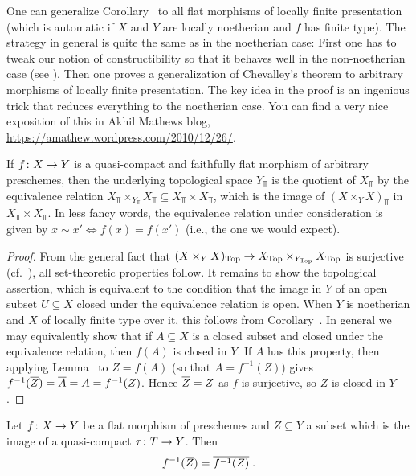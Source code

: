 \documentclass[a4paper,parskip=half,numbers=enddot, DIV=12]{scrreprt}
\begin{document}
\begin{rem}
	One can generalize Corollary~ to all flat morphisms of locally finite presentation (which is automatic if $X$ and $Y$ are locally noetherian and $f$ has finite type). The strategy in general is quite the same as in the noetherian case: First one has to tweak our notion of constructibility so that it behaves well in the non-noetherian case (see \cite[ and  ]{stacks-project}). Then one proves a generalization of Chevalley's theorem to arbitrary morphisms of locally finite presentation. The key idea in the proof is an ingenious trick that reduces everything to the noetherian case. You can find a very nice exposition of this in Akhil Mathews blog, \url{https://amathew.wordpress.com/2010/12/26/}.
\end{rem}
\begin{prop}
	If $f\colon X\morphism Y$ is a quasi-compact and faithfully flat morphism of arbitrary preschemes, then the underlying topological space $Y_\Top$ is the quotient of $X_\Top$ by the equivalence relation $X_\Top\times_{Y_\Top}X_{\Top}\subseteq X_\Top\times X_\Top$, which is the image of $(X\times_YX)_\Top$ in $X_\Top\times X_\Top$. In less fancy words, the equivalence relation under consideration is given by $x\sim x'\Leftrightarrow f(x)=f(x')$ (i.e., the one we would expect).
\end{prop}
\begin{proof}
	From the general fact that $(X\times_YX)_\Top\morphism X_\Top\times_{Y_\Top}X_\Top$ is surjective (cf.\ \cite[Corollary~1.3.1]{alggeo1}), all set-theoretic properties follow. It remains to show the topological assertion, which is equivalent to the condition that the image in $Y$ of an open subset $U\subseteq X$ closed under the equivalence relation is open. When $Y$ is noetherian and $X$ of locally finite type over it, this follows from Corollary~. In general we may equivalently show that if $A\subseteq X$ is a closed subset and closed under the equivalence relation, then $f(A)$ is closed in $Y$. If $A$ has this property, then applying Lemma~ to $Z=f(A)$ (so that $A=f^{-1}(Z)$) gives $f^{-1}(\overline{Z})=\overline{A}=A=f^{-1}(Z)$. Hence $\overline{Z}=Z$ as $f$ is surjective, so $Z$ is closed in $Y$.
\end{proof}
\begin{lem}
	Let $f\colon X\morphism Y$ be a flat morphism of preschemes and $Z\subseteq Y$ a subset which is the image of a quasi-compact $\tau\colon T\morphism Y$. Then 
	\begin{align*}
		f^{-1}(\overline{Z})=\overline{f^{-1}(Z)}\;.
	\end{align*}
\end{lem}
\end{document}
